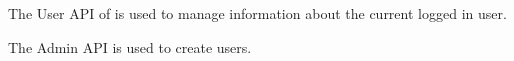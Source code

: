 The User API of \Rapture is used to manage information about the current logged in user.

The Admin API is used to create users.
